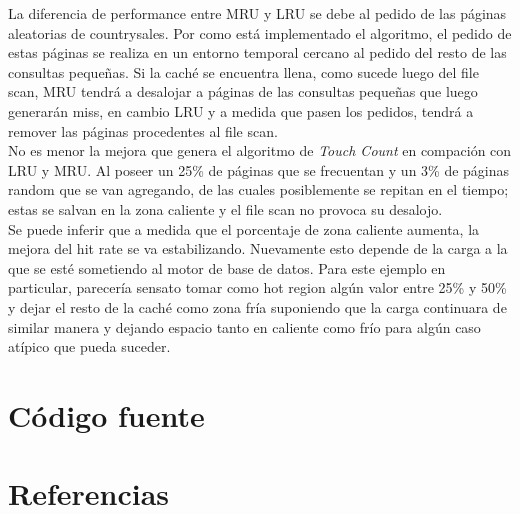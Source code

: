 \documentclass[11pt, a4paper, spanish]{article}
\begin{document}
La diferencia de performance entre MRU y LRU se debe al pedido de las p\'aginas aleatorias de countrysales. 
Por como est\'a implementado el algoritmo, el pedido de estas p\'aginas se realiza en un entorno temporal cercano 
al pedido del resto de las consultas peque\~{n}as. Si la cach\'e se encuentra llena, como sucede luego del file scan, 
MRU tendr\'a a desalojar a p\'aginas de las consultas peque\~{n}as que luego generar\'an miss, en cambio LRU y a medida
que pasen los pedidos, tendr\'a a remover las p\'aginas procedentes al file scan.\\

No es menor la mejora que genera el algoritmo de \textit{Touch Count} en compaci\'on con LRU y MRU. 
Al poseer un 25\% de p\'aginas que se frecuentan y un 3\% de p\'aginas random que se van agregando, 
de las cuales posiblemente se repitan en el tiempo; estas se salvan en la zona caliente y el file scan no provoca su desalojo.\\

Se puede inferir que a medida que el porcentaje de zona caliente aumenta, la mejora del hit rate se va estabilizando. 
Nuevamente esto depende de la carga a la que se est\'e sometiendo al motor de base de datos.
 Para este ejemplo en particular, parecer\'ia sensato tomar como hot region alg\'un valor entre 25\% y 50\% 
y dejar el resto de la cach\'e como zona fr\'ia suponiendo que la carga continuara de similar manera y dejando espacio tanto en caliente como fr\'io para alg\'un caso at\'ipico que pueda suceder.

\section{C\'odigo fuente}

\section{Referencias}
\end{document}
